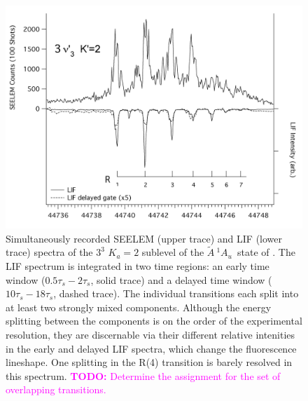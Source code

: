 \documentclass[12pt]{mitthesis}
\newcommand{\TODO} [1]{\textcolor{magenta}{\textbf{TODO:} #1}}
\newcommand{\astate}{$
  \tilde{A} \: ^1\!A_u
  $}
\newcommand{\Ka}[1]{$K_a\!\!=\!#1$}
\begin{document}


\begin{figure}
  \caption{Simultaneously recorded SEELEM (upper trace) and LIF (lower
    trace) spectra of the $3^3$ \Ka{2} sublevel of the \astate\ state
    of .  The LIF spectrum is integrated in two time regions:
    an early time window ($0.5\tau_s-2\tau_s$, solid trace) and a
    delayed time window ($10\tau_s-18\tau_s$, dashed trace).  The
    individual transitions each split into at least two strongly mixed
    components.  Although the energy splitting between the components
    is on the order of the experimental resolution, they are
    discernable via their different relative intenities in the early
    and delayed LIF spectra, which change the fluorescence lineshape.
    One splitting in the R(4) transition is barely resolved in this
    spectrum.  \TODO{Determine the assignment for the set of
      overlapping transitions.}}
  \label{fig:spectrum-33k2}
  \centering
  \includegraphics[width=7in,angle=90]{acetylene-33k2-r1r7.png}
\end{figure}
\end{document}

